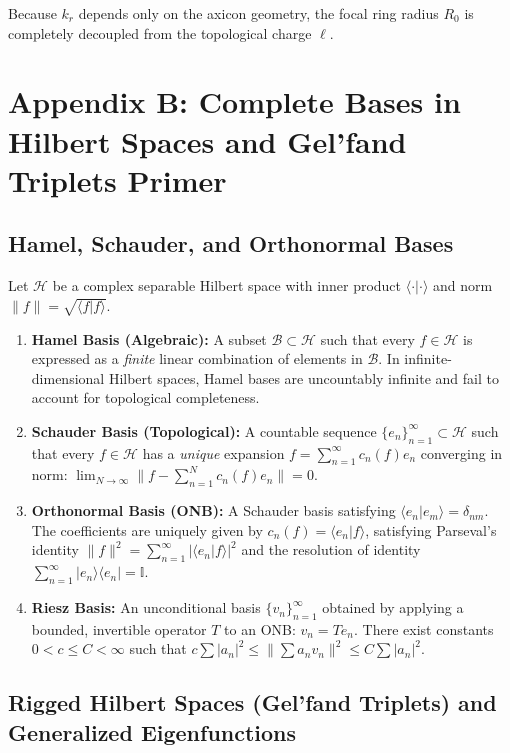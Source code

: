 \documentclass{optica-article}
\begin{document}
Because $k_r$ depends only on the axicon geometry, the focal ring radius $R_0$ is completely decoupled from the topological charge $\ell$.

\section{Appendix B: Complete Bases in Hilbert Spaces and Gel'fand Triplets Primer}
\label{app:hilbert}

\subsection{Hamel, Schauder, and Orthonormal Bases}

Let $\mathcal{H}$ be a complex separable Hilbert space with inner product $\langle \cdot | \cdot \rangle$ and norm $\|f\| = \sqrt{\langle f | f \rangle}$.
\begin{enumerate}
    \item \textbf{Hamel Basis (Algebraic):} A subset $\mathcal{B} \subset \mathcal{H}$ such that every $f \in \mathcal{H}$ is expressed as a \emph{finite} linear combination of elements in $\mathcal{B}$. In infinite-dimensional Hilbert spaces, Hamel bases are uncountably infinite and fail to account for topological completeness.
    \item \textbf{Schauder Basis (Topological):} A countable sequence $\{e_n\}_{n=1}^\infty \subset \mathcal{H}$ such that every $f \in \mathcal{H}$ has a \emph{unique} expansion $f = \sum_{n=1}^\infty c_n(f) e_n$ converging in norm: $\lim_{N \to \infty} \|f - \sum_{n=1}^N c_n(f) e_n\| = 0$.
    \item \textbf{Orthonormal Basis (ONB):} A Schauder basis satisfying $\langle e_n | e_m \rangle = \delta_{nm}$. The coefficients are uniquely given by $c_n(f) = \langle e_n | f \rangle$, satisfying Parseval's identity $\|f\|^2 = \sum_{n=1}^\infty |\langle e_n | f \rangle|^2$ and the resolution of identity $\sum_{n=1}^\infty |e_n\rangle \langle e_n| = \mathbb{I}$.
    \item \textbf{Riesz Basis:} An unconditional basis $\{v_n\}_{n=1}^\infty$ obtained by applying a bounded, invertible operator $T$ to an ONB: $v_n = T e_n$. There exist constants $0 < c \le C < \infty$ such that $c \sum |a_n|^2 \le \|\sum a_n v_n\|^2 \le C \sum |a_n|^2$.
\end{enumerate}

\subsection{Rigged Hilbert Spaces (Gel'fand Triplets) and Generalized Eigenfunctions}
\end{document}
